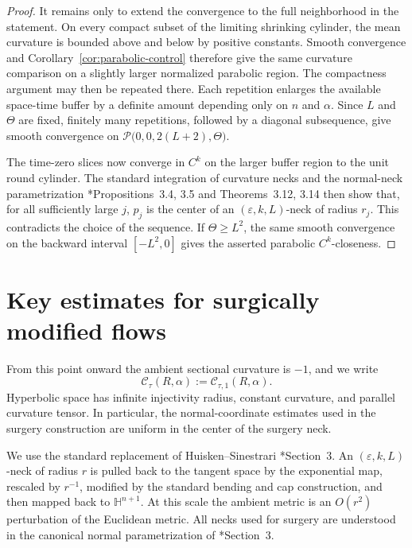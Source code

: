 \documentclass[11pt,reqno]{amsart}
\theoremstyle{definition}
\theoremstyle{remark}
\numberwithin{equation}{section}
\newcommand{\Hh}{\mathbb H}
\newcommand{\eps}{\varepsilon}
\newcommand{\CC}{\mathcal C}
\begin{document}
\begin{proof}
  It remains only to extend the convergence to the full neighborhood in
the statement.  On every compact subset of the limiting shrinking
cylinder, the mean curvature is bounded above and below by positive
constants.  Smooth convergence and
Corollary~\ref{cor:parabolic-control} therefore give the same curvature
comparison on a slightly larger normalized parabolic region.  The
compactness argument may then be repeated there.  Each repetition
enlarges the available space-time buffer by a definite amount depending
only on $n$ and $\alpha$.  Since $L$ and $\Theta$ are fixed, finitely
many repetitions, followed by a diagonal subsequence, give smooth
convergence on $\mathcal P\bigl(0,0,2(L+2),\Theta\bigr)$.  

  The time-zero slices now converge in $C^k$ on the larger buffer region to
  the unit round cylinder.  The standard integration of curvature necks and
  the normal-neck parametrization
  \cite{HS09}*{Propositions~3.4, 3.5 and Theorems~3.12, 3.14}
  then show that, for all sufficiently large $j$, $p_j$ is the center of an
  $(\eps,k,L)$-neck of radius $r_j$.  This contradicts the choice of the
  sequence.  If $\Theta\geq L^2$, the same smooth convergence on the
  backward interval $[-L^2,0]$ gives the asserted parabolic $C^k$-closeness.
\end{proof}

\section{Key estimates for surgically modified flows}
\label{sec:standard-surgery}

From this point onward the ambient sectional curvature is $-1$, and we write
\begin{equation*}
\CC_\tau(R,\alpha):=\CC_{\tau,1}(R,\alpha).
\end{equation*}
Hyperbolic space has infinite injectivity radius, constant curvature, and
parallel curvature tensor.  In particular, the normal-coordinate estimates
used in the surgery construction are uniform in the center of the surgery
neck.

We use the standard replacement of Huisken--Sinestrari
\cite{HS09}*{Section~3}.  An $(\eps,k,L)$-neck of radius $r$ is pulled back
to the tangent space by the exponential map, rescaled by $r^{-1}$,
modified by the standard bending and cap construction, and then mapped
back to $\Hh^{n+1}$.  At this scale the ambient metric is an $O(r^2)$
perturbation of the Euclidean metric.  All necks used for surgery are
understood in the canonical normal parametrization of
\cite{HS09}*{Section~3}.
\end{document}
